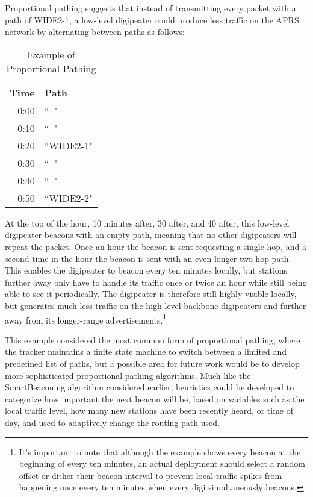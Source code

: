 Proportional pathing suggests that instead of transmitting every packet with
a path of WIDE2-1, a low-level digipeater could produce less traffic on the
APRS network by alternating between paths as follows:
\begin{table}[!h]
	\centering
	\begin{tabular}{ | r | l |}
		\hline
		Time & Path \\ \hline
		0:00 & ``~" \\ \hline
		0:10 & ``~" \\ \hline
		0:20 & ``WIDE2-1" \\ \hline
		0:30 & ``~" \\ \hline
		0:40 & ``~" \\ \hline
		0:50 & ``WIDE2-2" \\ \hline
	\end{tabular}
	\caption{Example of Proportional Pathing}
	\label{tab:exproppath}
\end{table}

At the top of the hour, 10 minutes after, 30 after, and 40 after, 
this low-level digipeater
beacons with an empty path, meaning that no other digipeaters will repeat the
packet.
Once an hour the beacon is sent requesting a single hop, and a second time
in the hour the beacon is sent with an even longer two-hop path.
This enables the digipeater to beacon every ten minutes locally,
but stations further away only have to handle its traffic once or twice an hour
while still being able to see it periodically.
The digipeater is therefore still highly visible locally, but generates
much less traffic on the high-level backbone digipeaters and further away from its
longer-range advertisements.\footnote{It's important
	to note that although the example shows every beacon at the beginning of
	every ten minutes, an actual deployment should select a random offset
or dither their beacon interval to prevent local traffic spikes 
from happening once every ten minutes when every digi simultaneously beacons.}

This example considered the most common form of proportional pathing,
where the tracker maintains a finite state machine to switch between
a limited and predefined list of paths,
but a possible area for future work would be to develop more sophisticated
proportional pathing algorithms.
Much like the SmartBeaconing algorithm considered earlier,
heuristics could be developed to categorize how important the next beacon
will be, based on variables such as the local traffic level,
how many new stations have been recently heard, or time of day,
and used to adaptively change the routing path used.

